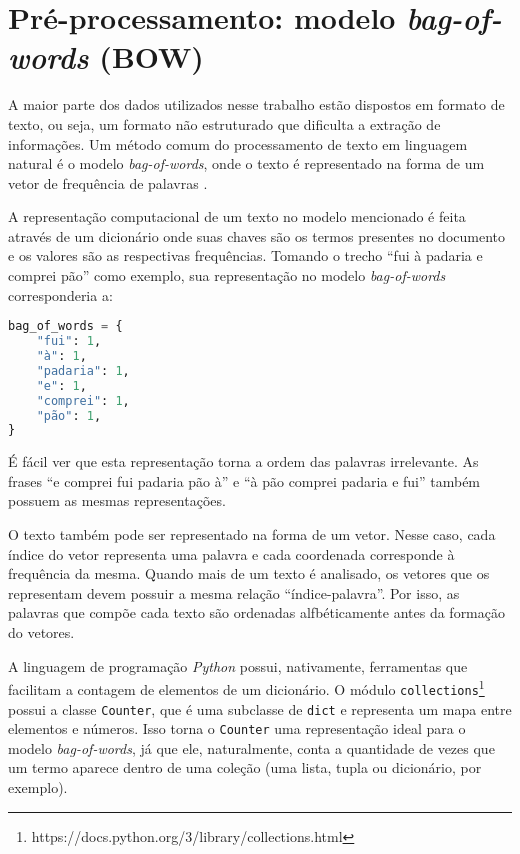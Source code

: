 \section{Pré-processamento: modelo \textit{bag-of-words} (BOW)}
\label{sec:modelo_te}

A maior parte dos dados utilizados nesse trabalho estão dispostos em formato de texto, ou seja, um formato não estruturado que dificulta a extração de informações. Um método comum do processamento de texto em linguagem natural é o modelo \textit{bag-of-words}, onde o texto é representado na forma de um vetor de frequência de palavras \cite{pretext}.

A representação computacional de um texto no modelo mencionado é feita através de um dicionário onde suas chaves são os termos presentes no documento e os valores são as respectivas frequências. Tomando o trecho ``fui à padaria e comprei pão'' como exemplo, sua representação no modelo \textit{bag-of-words} corresponderia a:

\begin{lstlisting}[language=Python, caption=Representação de um trecho  no modelo bag-of-words]
bag_of_words = {
    "fui": 1,
    "à": 1,
    "padaria": 1,
    "e": 1,
    "comprei": 1,
    "pão": 1,
}
\end{lstlisting}

É fácil ver que esta representação torna a ordem das palavras irrelevante. As frases ``e comprei fui padaria pão à'' e ``à pão comprei padaria e fui'' também possuem as mesmas representações.

O texto também pode ser representado na forma de um vetor. Nesse caso, cada índice do vetor representa uma palavra e cada coordenada corresponde à frequência da mesma. Quando mais de um texto é analisado, os vetores que os representam devem possuir a mesma relação ``índice-palavra''. Por isso, as palavras que compõe cada texto são ordenadas alfbéticamente antes da formação do vetores.

A linguagem de programação \textit{Python} possui, nativamente, ferramentas que facilitam a contagem de elementos de um dicionário. O módulo \texttt{collections}\footnote{https://docs.python.org/3/library/collections.html} possui a classe \texttt{Counter}, que é uma subclasse de \texttt{dict} e representa um mapa entre elementos e números. Isso torna o \texttt{Counter} uma representação ideal para o modelo \textit{bag-of-words}, já que ele, naturalmente, conta a quantidade de vezes que um termo aparece dentro de uma coleção (uma lista, tupla ou dicionário, por exemplo).




